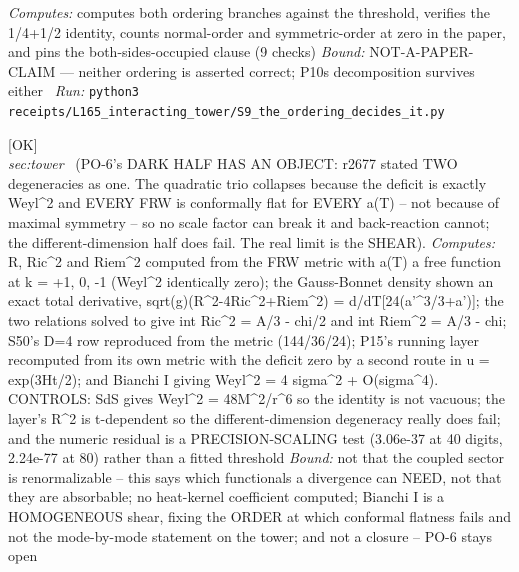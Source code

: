 \begin{description}
\emph{Computes:} computes both ordering branches against the threshold, verifies the 1/4+1/2 identity, counts normal-order and symmetric-order at zero in the paper, and pins the both-sides-occupied clause (9 checks)
 \emph{Bound:} NOT-A-PAPER-CLAIM --- neither ordering is asserted correct; P10s decomposition survives either
\ \emph{Run:} \texttt{python3 receipts/L165\_interacting\_tower/S9\_the\_ordering\_decides\_it.py}
\item[\label{rcpt:Q1_the_degeneracy_is_conformal_flatness_not_maximal_symmetry_so_no_scale_factor_can_break_it}\textbf{}\quad\texttt{Q1\_the\_degeneracy\_is\_conformal\_flatness\_not\_maximal\_symmetry\_so\_no\_scale\_factor\_can\_break\_it}]\hfill\textsf{[OK]}\\
\textit{sec:tower} \ (PO-6's DARK HALF HAS AN OBJECT: r2677 stated TWO degeneracies as one. The quadratic trio collapses because the deficit is exactly Weyl\textasciicircum{}2 and EVERY FRW is conformally flat for EVERY a(T) -- not because of maximal symmetry -- so no scale factor can break it and back-reaction cannot; the different-dimension half does fail. The real limit is the SHEAR). 
\emph{Computes:} R, Ric\textasciicircum{}2 and Riem\textasciicircum{}2 computed from the FRW metric with a(T) a free function at k = +1, 0, -1 (Weyl\textasciicircum{}2 identically zero); the Gauss-Bonnet density shown an exact total derivative, sqrt(g)(R\textasciicircum{}2-4Ric\textasciicircum{}2+Riem\textasciicircum{}2) = d/dT[24(a'\textasciicircum{}3/3+a')]; the two relations solved to give int Ric\textasciicircum{}2 = A/3 - chi/2 and int Riem\textasciicircum{}2 = A/3 - chi; S50's D=4 row reproduced from the metric (144/36/24); P15's running layer recomputed from its own metric with the deficit zero by a second route in u = exp(3Ht/2); and Bianchi I giving Weyl\textasciicircum{}2 = 4 sigma\textasciicircum{}2 + O(sigma\textasciicircum{}4). CONTROLS: SdS gives Weyl\textasciicircum{}2 = 48M\textasciicircum{}2/r\textasciicircum{}6 so the identity is not vacuous; the layer's R\textasciicircum{}2 is t-dependent so the different-dimension degeneracy really does fail; and the numeric residual is a PRECISION-SCALING test (3.06e-37 at 40 digits, 2.24e-77 at 80) rather than a fitted threshold
 \emph{Bound:} not that the coupled sector is renormalizable -- this says which functionals a divergence can NEED, not that they are absorbable; no heat-kernel coefficient computed; Bianchi I is a HOMOGENEOUS shear, fixing the ORDER at which conformal flatness fails and not the mode-by-mode statement on the tower; and not a closure -- PO-6 stays open

\end{description}
